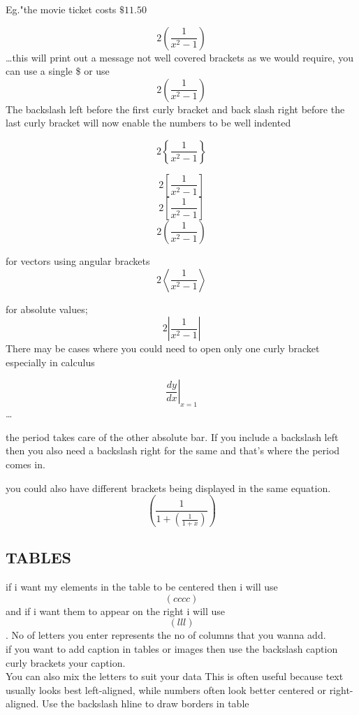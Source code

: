 \documentclass[a4paper,12pt]{article}
\begin{document}
  		Eg."the movie ticket costs $\$11.50$
  		
  		$$2(\dfrac{1}{x^2-1})$$ \ldots this will print out a message not well covered brackets as we would require, you can use a single \$ or use $$2\left(\frac{1}{x^2-1}\right)$$ 	The backslash left before the first curly bracket and back slash right before the last curly bracket will now enable the numbers to be well indented
  		
  		$$2\left\{\dfrac{1}{x^2-1}\right\}$$
  		
  		$$2\left[\frac{1}{x^2-1}\right]$$
  		$$2\left[\frac{1}{x^2-1}\right]$$
  		$$2\left(   \frac{1}{x^2-1}       \right)      $$
  		
  		for vectors using angular brackets
  		$$2\left \langle \frac{1}{x^2-1}\right \rangle$$
  		
  		for absolute values;
  		$$2\left |\frac{1}{x^2-1}\right| $$
  		There may be cases where you could need to open only one curly bracket especially in calculus
  		
  		$$\left.\dfrac{dy}{dx}\right |_{x=1}$$ \ldots
  		
  		 the period takes care of the other absolute bar. If you include a backslash left then you also need a backslash right for the same and that's where the period comes in.
  		
  		 you could also have different brackets being displayed in the same equation.
  		 $$\left(\frac{1}{1+\left(\frac{1}{1+x}\right)}\right)$$
  		 
  		 
  		 
  		 
  		 
  		 
  		 \subsection{TABLES}
  		 if i want my elements in the table to be centered then i will use $$\left(cccc\right)$$ and if i want them to appear on the right i will use $$\left(lll\right)$$. No of letters you enter represents the no of columns that you wanna add.\\
  		 if you want to add caption in tables or images then use the backslash caption curly brackets your caption.\\
  		 You can also mix the letters to suit your data
  		 This is often useful because text usually looks best left-aligned, while numbers often look better centered or right-aligned.
  		 Use the backslash hline to draw borders in table\\[2pt]
  		 
\end{document}
